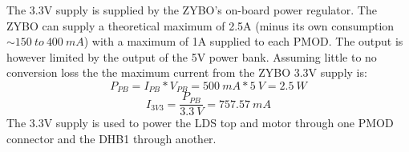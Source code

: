 \documentclass[Main]{subfiles}
\begin{document}
		The 3.3V supply is supplied by the ZYBO's on-board power regulator.
		The ZYBO can supply a theoretical maximum of 2.5A (minus its own consumption $\sim150\ to\ 400\ mA$) with a maximum of 1A supplied to each PMOD.
		The output is however limited by the output of the 5V power bank.
		Assuming little to no conversion loss the the maximum current from the ZYBO 3.3V supply is:
		\begin{equation}
			P_{PB} = I_{PB} * V_{PB} = 
			500\ mA * 5\ V =
			2.5\ W
		\end{equation}
		\begin{equation}
			I_{3V3} = 
			\frac{P_{PB}}{3.3\ V} =
			757.57\ mA
		\end{equation}
		The 3.3V supply is used to power the LDS top and motor through one PMOD connector and the DHB1 through another.


\end{document}
